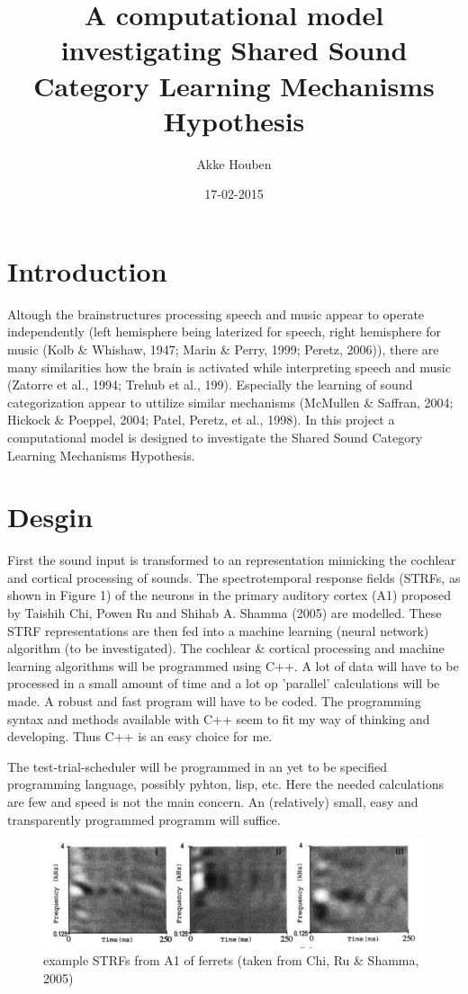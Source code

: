 \documentclass{article}
\title{A computational model investigating Shared Sound Category Learning Mechanisms Hypothesis}
\author{Akke Houben}
\date{17-02-2015}
\begin{document}
\maketitle
\section{Introduction}
Altough the brainstructures processing speech and music appear to operate independently (left hemisphere being laterized for speech, right hemisphere for music (Kolb \& Whishaw, 1947; Marin \& Perry, 1999; Peretz, 2006)), there are many similarities how the brain is activated while interpreting speech and music (Zatorre et al., 1994; Trehub et al., 199). Especially the learning of sound categorization appear to uttilize similar mechanisms (McMullen \& Saffran, 2004; Hickock \& Poeppel, 2004; Patel, Peretz, et al., 1998). In this project a computational model is designed to investigate the Shared Sound Category Learning Mechanisms Hypothesis. 

\section{Desgin}
First the sound input is transformed to an representation mimicking the cochlear and cortical processing of sounds. The spectrotemporal response fields (STRFs, as shown in Figure 1) of the neurons in the primary auditory cortex (A1) proposed by Taishih Chi, Powen Ru and Shihab A. Shamma (2005) are modelled. These STRF representations are then fed into a machine learning (neural network) algorithm (to be investigated).
The cochlear \& cortical processing and machine learning algorithms will be programmed using C++. A lot of data will have to be processed in a small amount of time and a lot op 'parallel' calculations will be made. A robust and fast program will have to be coded. The programming syntax and methods available with C++ seem to fit my way of thinking and developing. Thus C++ is an easy choice for me.

The test-trial-scheduler will be programmed in an yet to be specified programming language, possibly pyhton, lisp, etc. Here the needed calculations are few and speed is not the main concern. An (relatively) small, easy and transparently programmed programm will suffice.
\begin{figure}
	\includegraphics[width=\linewidth]{strfs.jpg}
	\caption{example STRFs from A1 of ferrets (taken from Chi, Ru \& Shamma, 2005)}
	\label{fig:strf}
\end{figure}
\end{document}
